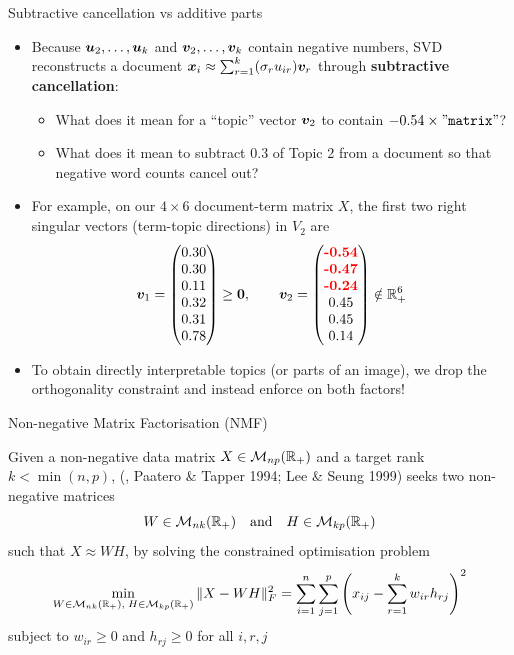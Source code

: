 \documentclass[aspectratio=169]{beamer}\usepackage[]{graphicx}\usepackage[]{xcolor}
\begin{document}
\begin{frame}{Subtractive cancellation vs additive parts}
\begin{itemize}
\item Because $\bm{u}_2, \ldots, \bm{u}_k$ and $\bm{v}_2, \ldots, \bm{v}_k$ contain negative numbers, SVD reconstructs a document $\bm{x}_i \approx \sum_{r=1}^k (\sigma_r u_{ir}) \bm{v}_r$ through \textbf{subtractive cancellation}:
\begin{itemize}
\item What does it mean for a ``topic'' vector $\bm{v}_2$ to contain $-0.54 \times {\tt "matrix"}$?
\item What does it mean to subtract $0.3$ of Topic 2 from a document so that negative word counts cancel out?
\end{itemize}
\vfill
\item For example, on our $4 \times 6$ document-term matrix $X$, the first two right singular vectors (term-topic directions) in $V_2$ are
\[
\bv_1 = \begin{pmatrix} 0.30 \\ 0.30 \\ 0.11 \\ 0.32 \\ 0.31 \\ 0.78 \end{pmatrix} \ge \b0, \qquad
\bv_2 = \begin{pmatrix} \boldred{-0.54} \\ \boldred{-0.47} \\ \boldred{-0.24} \\ 0.45 \\ 0.45 \\ 0.14 \end{pmatrix} \notin \IRplus^6
\]
\item To obtain directly interpretable topics (or parts of an image), we drop the orthogonality constraint and instead enforce  on both factors!
\end{itemize}
\end{frame}


\begin{frame}{Non-negative Matrix Factorisation (NMF)}
\begin{importantdefinition}
Given a non-negative data matrix $X \in \mathcal{M}_{np}(\mathbb{R}_+)$ and a target rank $k < \min(n, p)$,  (, Paatero \& Tapper 1994; Lee \& Seung 1999) seeks two non-negative matrices
\[
W \in \mathcal{M}_{nk}(\mathbb{R}_+) \quad\textrm{and}\quad H \in \mathcal{M}_{kp}(\mathbb{R}_+)
\]
such that $X \approx W H$, by solving the constrained optimisation problem
\[
\min_{W \in \mathcal{M}_{nk}(\mathbb{R}_+),\; H \in \mathcal{M}_{kp}(\mathbb{R}_+)} \|X - W H\|_F^2
= \sum_{i=1}^n \sum_{j=1}^p \left(x_{ij} - \sum_{r=1}^k w_{ir} h_{rj}\right)^2
\]
subject to $w_{ir} \ge 0$ and $h_{rj} \ge 0$ for all $i, r, j$
\end{importantdefinition}
\end{frame}
\end{document}
